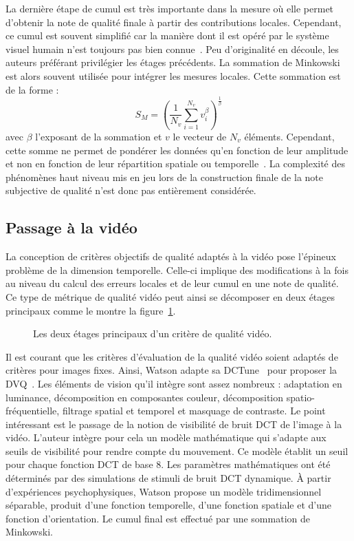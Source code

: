 La dernière étape de cumul est très importante dans la mesure où elle permet d'obtenir la note de qualité finale à partir des contributions locales. Cependant, ce cumul est souvent simplifié car la manière dont il est opéré par le système visuel humain n'est toujours pas bien connue~\cite{wang-ovqa}. Peu d'originalité en découle, les auteurs préférant privilégier les étages précédents. La sommation de Minkowski est alors souvent utilisée pour intégrer les mesures locales. Cette sommation est de la forme :
\begin{equation}
S_M = \left( \frac{1}{N_v} \sum\limits_{i=1}^{N_v} v_i^\beta \right)^{\frac{1}{\beta}}
\end{equation}
%
avec $\beta$ l'exposant de la sommation et $v$ le vecteur de $N_v$ éléments. Cependant, cette somme ne permet de pondérer les données qu’en fonction de leur amplitude et non en fonction de leur répartition spatiale ou temporelle~\cite{wang-icassp2002}. La complexité des phénomènes haut niveau mis en jeu lors de la construction finale de la note subjective de qualité n'est donc pas entièrement considérée.


\subsection{Passage à la vidéo}
La conception de critères objectifs de qualité adaptés à la vidéo pose l'épineux problème de la dimension temporelle. Celle-ci implique des modifications à la fois au niveau du calcul des erreurs locales et de leur cumul en une note de qualité. Ce type de métrique de qualité vidéo peut ainsi se décomposer en deux étages principaux comme le montre la figure~\ref{fig:ApprocheSVHVideo}.

\begin{figure}[htbp]
	\centering
	\begin{tikzpicture}[text centered, node distance = 3cm]\end{tikzpicture}
	\caption{Les deux étages principaux d'un critère de qualité vidéo.}
	\label{fig:ApprocheSVHVideo}
\end{figure}

Il est courant que les critères d'évaluation de la qualité vidéo soient adaptés de critères pour images fixes. Ainsi, Watson adapte sa DCTune~\cite{watson-dctune} pour proposer la DVQ~\cite{watson-dvq}. Les éléments de vision qu'il intègre sont assez nombreux : adaptation en luminance, décomposition en composantes couleur, décomposition spatio-fréquentielle, filtrage spatial et temporel et masquage de contraste. Le point intéressant est le passage de la notion de visibilité de bruit DCT de l'image à la vidéo. L'auteur intègre pour cela un modèle mathématique qui s'adapte aux seuils de visibilité pour rendre compte du mouvement. Ce modèle établit un seuil pour chaque fonction DCT de base 8. Les paramètres mathématiques ont été déterminés par des simulations de stimuli de bruit DCT dynamique. À partir d'expériences psychophysiques, Watson propose un modèle tridimensionnel séparable, produit d'une fonction temporelle, d'une fonction spatiale et d'une fonction d'orientation. Le cumul final est effectué par une sommation de Minkowski.

